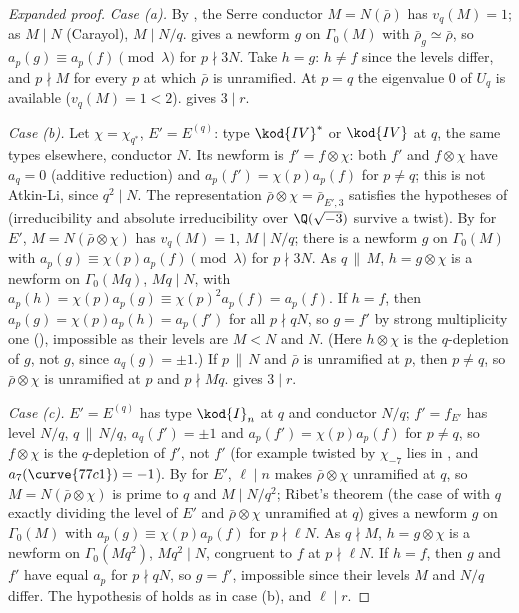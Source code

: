 \begin{sloppypar}
\begin{proof}[Expanded proof]
\emph{Case (a).} By , the Serre conductor $M=N(\bar\rho)$ has $v_q(M)=1$; as $M\mid N$ (Carayol), $M\mid N/q$.  gives a newform $g$ on $\Gamma_0(M)$ with
$\bar\rho_g\simeq\bar\rho$, so $a_p(g)\equiv a_p(f)\pmod\lambda$ for $p\nmid3N$. Take $h=g$: $h\ne f$ since the levels differ, and $p\nmid M$ for every $p$ at which $\bar\rho$ is unramified. At $p=q$ the
eigenvalue $0$ of $U_q$ is available ($v_q(M)=1<2$).  gives $3\mid r$.

\emph{Case (b).} Let $\chi=\chi_{q^*}$, $E'=E^{(q)}$: type $\kod{IV}^*$ or $\kod{IV}$ at $q$, the same types elsewhere, conductor $N$. Its newform is $f'=f\otimes\chi$: both $f'$ and $f\otimes\chi$ have
$a_q=0$ (additive reduction) and $a_p(f')=\chi(p)a_p(f)$ for $p\ne q$; this is not Atkin-Li, since $q^2\mid N$. The representation $\bar\rho\otimes\chi=\bar\rho_{E',3}$ satisfies the hypotheses
of  (irreducibility and absolute irreducibility over $\Q(\sqrt{-3})$ survive a twist). By  for $E'$, $M=N(\bar\rho\otimes\chi)$ has $v_q(M)=1$,
$M\mid N/q$; there is a newform $g$ on $\Gamma_0(M)$ with $a_p(g)\equiv\chi(p)a_p(f)\pmod\lambda$ for $p\nmid3N$. As $q\,\|\,M$, $h=g\otimes\chi$ is a newform on $\Gamma_0(Mq)$, $Mq\mid N$, with
$a_p(h)=\chi(p)a_p(g)\equiv\chi(p)^2a_p(f)=a_p(f)$. If $h=f$, then $a_p(g)=\chi(p)a_p(h)=a_p(f')$ for all $p\nmid qN$, so $g=f'$ by strong multiplicity one (), impossible as
their levels are $M<N$ and $N$. (Here $h\otimes\chi$ is the $q$-depletion of $g$, not $g$, since $a_q(g)=\pm1$.) If $p\,\|\,N$ and $\bar\rho$ is unramified at $p$, then $p\ne q$, so $\bar\rho\otimes\chi$ is
unramified at $p$ and $p\nmid Mq$.  gives $3\mid r$.

\emph{Case (c).} $E'=E^{(q)}$ has type $\kod{I}_n$ at $q$ and conductor $N/q$; $f'=f_{E'}$ has level $N/q$, $q\,\|\,N/q$, $a_q(f')=\pm1$ and $a_p(f')=\chi(p)a_p(f)$ for $p\ne q$, so $f\otimes\chi$ is
the $q$-depletion of $f'$, not $f'$ (for example  twisted by $\chi_{-7}$ lies in , and $a_7(\curve{77c1})=-1$). By  for $E'$, $\ell\mid n$ makes $\bar\rho\otimes\chi$
unramified at $q$, so $M=N(\bar\rho\otimes\chi)$ is prime to $q$ and $M\mid N/q^2$; Ribet's theorem (the case of  with $q$ exactly dividing the level of $E'$ and
$\bar\rho\otimes\chi$ unramified at $q$) gives a newform $g$ on $\Gamma_0(M)$ with $a_p(g)\equiv\chi(p)a_p(f)$ for $p\nmid\ell N$. As $q\nmid M$, $h=g\otimes\chi$ is a newform on $\Gamma_0(Mq^2)$, $Mq^2\mid N$,
congruent to $f$ at $p\nmid\ell N$. If $h=f$, then $g$ and $f'$ have equal $a_p$ for $p\nmid qN$, so $g=f'$, impossible since their levels $M$ and $N/q$ differ. The hypothesis of
 holds as in case (b), and $\ell\mid r$.
\end{proof}


\end{sloppypar}

